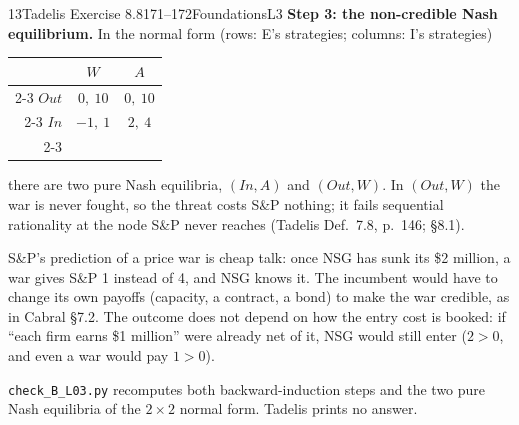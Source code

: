 \begin{exsol}{13}{Tadelis Exercise 8.8}{171--172}{Foundations}{L3}
\textbf{Step 3: the non-credible Nash equilibrium.} In the normal form (rows: E's strategies;
columns: I's strategies)
\begin{center}
\begin{tabular}{r|c|c|}
\multicolumn{1}{r}{} & \multicolumn{1}{c}{$W$} & \multicolumn{1}{c}{$A$}\\ \cline{2-3}
$\mathit{Out}$ & $0,\ 10$ & $0,\ 10$ \\ \cline{2-3}
$\mathit{In}$ & $-1,\ 1$ & $2,\ 4$ \\ \cline{2-3}
\end{tabular}
\end{center}
there are two pure Nash equilibria, $(\mathit{In},A)$ and $(\mathit{Out},W)$. In
$(\mathit{Out},W)$ the war is never fought, so the threat costs S\&P nothing; it fails
sequential rationality at the node S\&P never reaches (Tadelis Def.~7.8, p.~146; \S8.1).

\interp S\&P's prediction of a price war is cheap talk: once NSG has sunk its \$2 million, a war
gives S\&P 1 instead of 4, and NSG knows it. The incumbent would have to change its own payoffs
(capacity, a contract, a bond) to make the war credible, as in Cabral \S7.2.
The outcome does not depend on how the entry cost is booked: if ``each firm earns \$1 million''
were already net of it, NSG would still enter ($2 > 0$, and even a war would pay $1 > 0$).

\verify \texttt{check\_B\_L03.py} recomputes both backward-induction steps and the two pure
Nash equilibria of the $2\times2$ normal form. Tadelis prints no answer.

\end{exsol}
